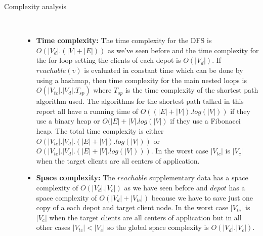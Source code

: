 \documentclass{article}
\begin{document}
\begin{description}
\item[Complexity analysis]\
\begin{itemize}
    \item \textbf{Time complexity:} The time complexity for the DFS is $O(|V_d|.(|V|+|E|))$ as we've seen before and the time complexity for the for loop setting the clients of each depot is $O(|V_d|)$. If $reachable(v)$ is evaluated in constant time which can be done by using a hashmap, then time complexity for the main nested loops is $O(|V_{tc}|.|V_d|.T_{sp})$ where $T_{sp}$ is the time complexity of the shortest path algorithm used. The algorithms for the shortest path talked in this report all have a running time of $O((|E|+|V|).log(|V|))$ if they use a binary heap or $O(|E|+|V|.log(|V|)$ if they use a Fibonacci heap. The total time complexity is either $O(|V_{tc}|.|V_d|.(|E|+|V|).log(|V|))$ or $O(|V_{tc}|.|V_d|.(|E|+|V|.log(|V|)))$. In the worst case $|V_{tc}|$ is $|V_{c}|$ when the target clients are all centers of application.
    \item \textbf{Space complexity:} The $reachable$ supplementary data has a space complexity of $O(|V_d|.|V_{c}|)$ as we have seen before and $depot$ has a space complexity of $O(|V_d|+|V_{tc}|)$ because we have to save just one copy of a each depot and target client node. In the worst case $|V_{tc}|$ is $|V_{c}|$ when the target clients are all centers of application but in all other cases $|V_{tc}| < |V_{c}|$ so the global space complexity is $O(|V_d|.|V_c|)$.
\end{itemize}
\end{description}
\newpage
\end{document}
